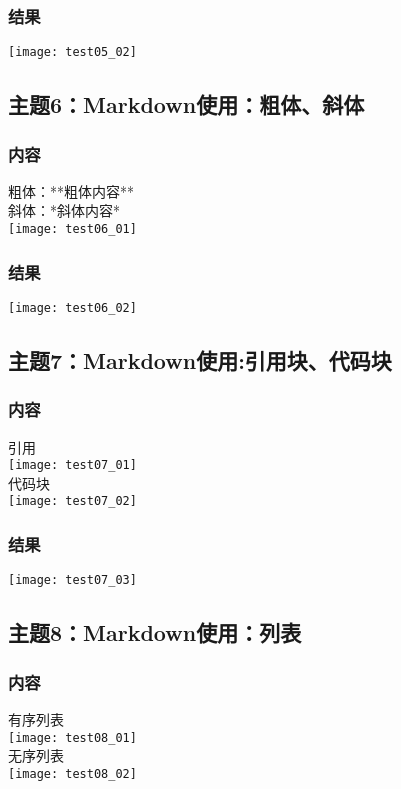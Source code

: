 \documentclass{article}
\begin{document}
\subsubsection{结果}  
\texttt{[image: test05\_02]}\\  
\vspace{1cm}
\subsection{主题6：Markdown使用：粗体、斜体}  
\subsubsection{内容}
粗体：**粗体内容**\\
斜体：*斜体内容*\\
\texttt{[image: test06\_01]}\\  
\subsubsection{结果}  
\texttt{[image: test06\_02]}\\  
\vspace{1cm}
\subsection{主题7：Markdown使用:引用块、代码块}  
\subsubsection{内容}
引用\\
\texttt{[image: test07\_01]}\\  
代码块\\
\texttt{[image: test07\_02]}\\  
\subsubsection{结果}  
\texttt{[image: test07\_03]}\\  
\newpage
\thispagestyle{empty}
\subsection{主题8：Markdown使用：列表}  
\subsubsection{内容}
有序列表\\
\texttt{[image: test08\_01]}\\  
无序列表\\
\texttt{[image: test08\_02]}\\
\end{document}

